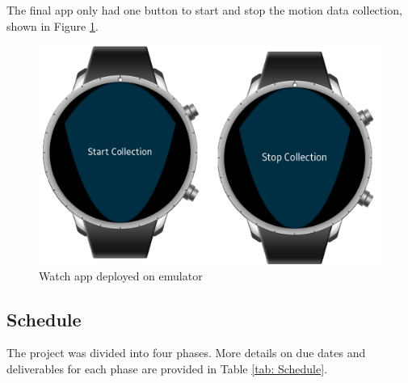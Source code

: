 \documentclass[conference]{IEEEtran}
\begin{document}
	The final app only had one button to start and stop the motion data collection, shown in Figure \ref{fig: watch_app_picture}.
	
	\begin{figure}[h]
		\centering
		\includegraphics[scale=0.75]{watch_app_picture}
		\caption{Watch app deployed on emulator}
		\label{fig: watch_app_picture}
	\end{figure}
	
	\subsection{Schedule}
	The project was divided into four phases.
	More details on due dates and deliverables for each phase are provided in Table \ref{tab: Schedule}.
	
\end{document}
